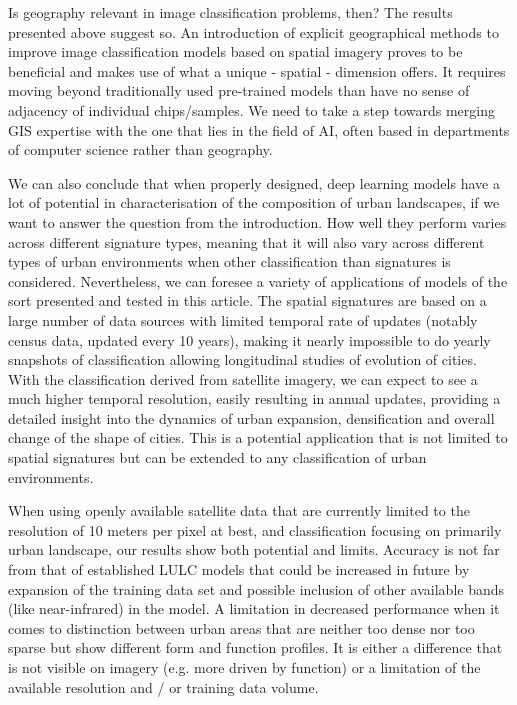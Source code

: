 Is geography relevant in image classification problems, then? The results presented
above suggest so. An introduction of explicit geographical methods to improve image
classification models based on spatial imagery proves to be beneficial and makes use of what a
unique - spatial - dimension offers. It requires moving beyond traditionally used
pre-trained models than have no sense of adjacency of individual chips/samples. We need
to take a step towards merging GIS expertise with the one that lies in the field of
AI, often based in departments of computer science rather than geography.

We can also conclude that when properly designed, deep learning models have a lot of potential
in characterisation of the composition of urban landscapes, if we want to answer the question
from the introduction. How well they perform varies across different signature types, meaning that
it will also vary across different types of urban environments when other classification than
signatures is considered. Nevertheless, we can foresee a variety of applications of
models of the sort presented and tested in this article. The spatial signatures are based on
a large number of data sources with limited temporal rate of updates (notably census data, updated every 10 years), making it nearly impossible to do yearly snapshots
of classification allowing longitudinal studies of evolution of cities. With the classification
derived from satellite imagery, we can expect to see a much higher temporal resolution,
easily resulting in annual updates, providing a detailed insight into the dynamics of urban
expansion, densification and overall change of the shape of cities. This is a potential
application that is not limited to spatial signatures but can be extended to any
classification of urban environments.


When using openly available satellite data that are currently limited to the resolution
of 10 meters per pixel at best, and classification focusing on primarily urban landscape,
our results show both potential and limits. Accuracy is not far from
that of established LULC models that could be increased in future by expansion of the training
data set and possible inclusion of other available bands (like near-infrared) in the model.
A limitation in decreased performance when it comes to distinction between urban areas that
are neither too dense nor too sparse but show different form and function profiles. It is
either a difference that is not visible on imagery (e.g. more driven by function) or a
limitation of the available resolution and / or training data volume.

